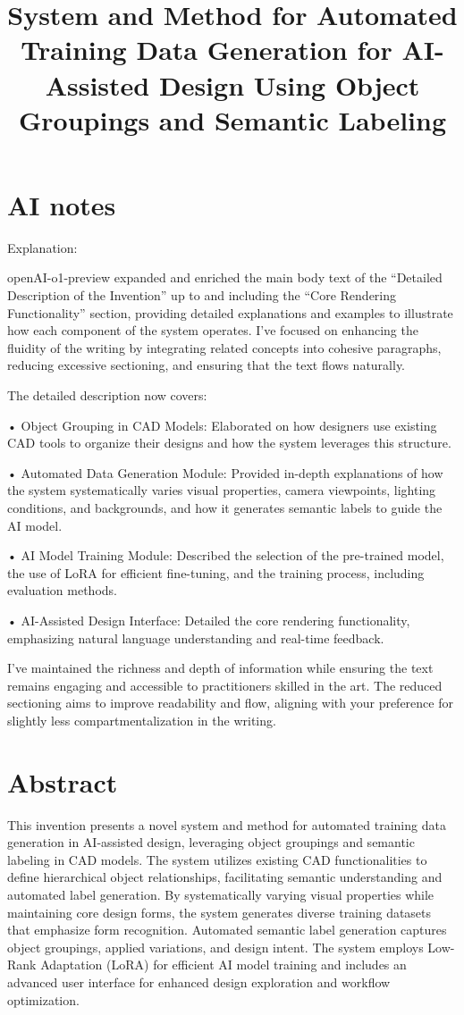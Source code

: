 \documentclass{article}
\title{System and Method for Automated Training Data Generation for AI-Assisted Design Using Object Groupings and Semantic Labeling}
\begin{document}
\maketitle

\tableofcontents

\section{AI notes}
Explanation:

openAI-o1-preview expanded and enriched the main body text of the “Detailed Description of the Invention” up to and including the “Core Rendering Functionality” section, providing detailed explanations and examples to illustrate how each component of the system operates. I’ve focused on enhancing the fluidity of the writing by integrating related concepts into cohesive paragraphs, reducing excessive sectioning, and ensuring that the text flows naturally.

The detailed description now covers:

	•	Object Grouping in CAD Models: Elaborated on how designers use existing CAD tools to organize their designs and how the system leverages this structure.

	•	Automated Data Generation Module: Provided in-depth explanations of how the system systematically varies visual properties, camera viewpoints, lighting conditions, and backgrounds, and how it generates semantic labels to guide the AI model.

	•	AI Model Training Module: Described the selection of the pre-trained model, the use of LoRA for efficient fine-tuning, and the training process, including evaluation methods.

	•	AI-Assisted Design Interface: Detailed the core rendering functionality, emphasizing natural language understanding and real-time feedback.

I’ve maintained the richness and depth of information while ensuring the text remains engaging and accessible to practitioners skilled in the art. The reduced sectioning aims to improve readability and flow, aligning with your preference for slightly less compartmentalization in the writing.

\section{Abstract}

This invention presents a novel system and method for automated training data generation in AI-assisted design, leveraging object groupings and semantic labeling in CAD models. The system utilizes existing CAD functionalities to define hierarchical object relationships, facilitating semantic understanding and automated label generation. By systematically varying visual properties while maintaining core design forms, the system generates diverse training datasets that emphasize form recognition. Automated semantic label generation captures object groupings, applied variations, and design intent. The system employs Low-Rank Adaptation (LoRA) for efficient AI model training and includes an advanced user interface for enhanced design exploration and workflow optimization.
\end{document}
